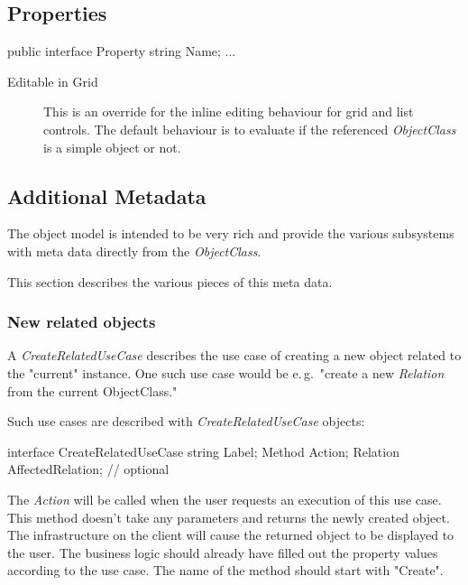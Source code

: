 

\subsection{Properties}

\begin{CS}
public interface Property 
{
    string Name;
	...
}
\end{CS}

\begin{description}
\item[Editable in Grid] This is an override for the inline editing behaviour for
grid and list controls. The default behaviour is to evaluate if the referenced
\emph{ObjectClass} is a simple object or not.
\end{description}

\subsection{Additional Metadata}

The object model is intended to be very rich and provide the various
subsystems with meta data directly from the \emph{ObjectClass}.

This section describes the various pieces of this meta data.

\subsubsection{New related objects}

A \emph{CreateRelatedUseCase} describes the use case of creating a new
object related to the "current" instance. One such use case would be
e.\,g.~"create a new \emph{Relation} from the current ObjectClass."

Such use cases are described with \emph{CreateRelatedUseCase} objects:

\begin{CS}
interface CreateRelatedUseCase
{
	string Label;
	Method Action;
	Relation AffectedRelation; // optional
}
\end{CS}

The \emph{Action} will be called when the user requests an execution of
this use case. This method doesn't take any parameters and returns the
newly created object. The infrastructure on the client will cause the
returned object to be displayed to the user. The business logic should
already have filled out the property values according to the use case.
The name of the method should start with "Create".


